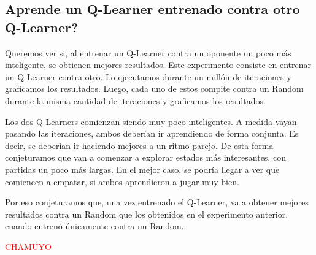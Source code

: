 \subsection{Aprende un Q-Learner entrenado contra otro Q-Learner?}

Queremos ver si, al entrenar un Q-Learner contra un oponente un poco más inteligente, se obtienen mejores resultados. Este experimento consiste en entrenar un Q-Learner contra otro. Lo ejecutamos durante un mill\'on de iteraciones y graficamos los resultados. Luego, cada uno de estos compite contra un Random durante la misma cantidad de iteraciones y graficamos los resultados.

Los dos Q-Learners comienzan siendo muy poco inteligentes. A medida vayan pasando las iteraciones, ambos deberían ir aprendiendo de forma conjunta. Es decir, se deberían ir haciendo mejores a un ritmo parejo. De esta forma conjeturamos que van a comenzar a explorar estados más interesantes, con partidas un poco más largas. En el mejor caso, se podría llegar a ver que comiencen a empatar, si ambos aprendieron a jugar muy bien.

Por eso conjeturamos que, una vez entrenado el Q-Learner, va a obtener mejores resultados contra un Random que los obtenidos en el experimento anterior, cuando entrenó únicamente contra un Random.

\textcolor{red}{CHAMUYO}
